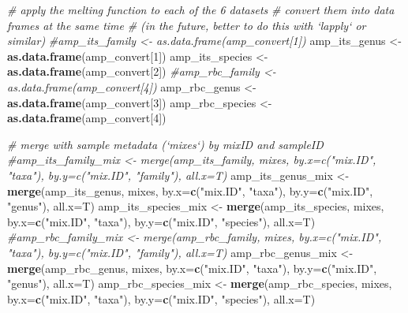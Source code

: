 \documentclass[
]{article}
\newenvironment{Shaded}{\begin{snugshade}}{\end{snugshade}}
\newcommand{\CommentTok}[1]{\textcolor[rgb]{0.56,0.35,0.01}{\textit{#1}}}
\newcommand{\DataTypeTok}[1]{\textcolor[rgb]{0.13,0.29,0.53}{#1}}
\newcommand{\DecValTok}[1]{\textcolor[rgb]{0.00,0.00,0.81}{#1}}
\newcommand{\KeywordTok}[1]{\textcolor[rgb]{0.13,0.29,0.53}{\textbf{#1}}}
\newcommand{\NormalTok}[1]{#1}
\newcommand{\StringTok}[1]{\textcolor[rgb]{0.31,0.60,0.02}{#1}}
\begin{document}
\begin{Shaded}
\begin{Highlighting}[]
\CommentTok{# apply the melting function to each of the 6 datasets}
\CommentTok{# convert them into data frames at the same time}
\CommentTok{# (in the future, better to do this with `lapply` or similar)}
\CommentTok{#amp_its_family <- as.data.frame(amp_convert[1])}
\NormalTok{amp_its_genus <-}\StringTok{ }\KeywordTok{as.data.frame}\NormalTok{(amp_convert[}\DecValTok{1}\NormalTok{])}
\NormalTok{amp_its_species <-}\StringTok{ }\KeywordTok{as.data.frame}\NormalTok{(amp_convert[}\DecValTok{2}\NormalTok{])}
\CommentTok{#amp_rbc_family <- as.data.frame(amp_convert[4])}
\NormalTok{amp_rbc_genus <-}\StringTok{ }\KeywordTok{as.data.frame}\NormalTok{(amp_convert[}\DecValTok{3}\NormalTok{])}
\NormalTok{amp_rbc_species <-}\StringTok{ }\KeywordTok{as.data.frame}\NormalTok{(amp_convert[}\DecValTok{4}\NormalTok{])}

\CommentTok{# merge with sample metadata (`mixes`) by mixID and sampleID}
\CommentTok{#amp_its_family_mix <- merge(amp_its_family, mixes, by.x=c("mix.ID", "taxa"), by.y=c("mix.ID", "family"), all.x=T)}
\NormalTok{amp_its_genus_mix <-}\StringTok{ }\KeywordTok{merge}\NormalTok{(amp_its_genus, mixes, }\DataTypeTok{by.x=}\KeywordTok{c}\NormalTok{(}\StringTok{"mix.ID"}\NormalTok{, }\StringTok{"taxa"}\NormalTok{), }\DataTypeTok{by.y=}\KeywordTok{c}\NormalTok{(}\StringTok{"mix.ID"}\NormalTok{, }\StringTok{"genus"}\NormalTok{), }\DataTypeTok{all.x=}\NormalTok{T)}
\NormalTok{amp_its_species_mix <-}\StringTok{ }\KeywordTok{merge}\NormalTok{(amp_its_species, mixes, }\DataTypeTok{by.x=}\KeywordTok{c}\NormalTok{(}\StringTok{"mix.ID"}\NormalTok{, }\StringTok{"taxa"}\NormalTok{), }\DataTypeTok{by.y=}\KeywordTok{c}\NormalTok{(}\StringTok{"mix.ID"}\NormalTok{, }\StringTok{"species"}\NormalTok{), }\DataTypeTok{all.x=}\NormalTok{T)}
\CommentTok{#amp_rbc_family_mix <- merge(amp_rbc_family, mixes, by.x=c("mix.ID", "taxa"), by.y=c("mix.ID", "family"), all.x=T)}
\NormalTok{amp_rbc_genus_mix <-}\StringTok{ }\KeywordTok{merge}\NormalTok{(amp_rbc_genus, mixes, }\DataTypeTok{by.x=}\KeywordTok{c}\NormalTok{(}\StringTok{"mix.ID"}\NormalTok{, }\StringTok{"taxa"}\NormalTok{), }\DataTypeTok{by.y=}\KeywordTok{c}\NormalTok{(}\StringTok{"mix.ID"}\NormalTok{, }\StringTok{"genus"}\NormalTok{), }\DataTypeTok{all.x=}\NormalTok{T)}
\NormalTok{amp_rbc_species_mix <-}\StringTok{ }\KeywordTok{merge}\NormalTok{(amp_rbc_species, mixes, }\DataTypeTok{by.x=}\KeywordTok{c}\NormalTok{(}\StringTok{"mix.ID"}\NormalTok{, }\StringTok{"taxa"}\NormalTok{), }\DataTypeTok{by.y=}\KeywordTok{c}\NormalTok{(}\StringTok{"mix.ID"}\NormalTok{, }\StringTok{"species"}\NormalTok{), }\DataTypeTok{all.x=}\NormalTok{T)}


\end{Highlighting}
\end{Shaded}
\end{document}
